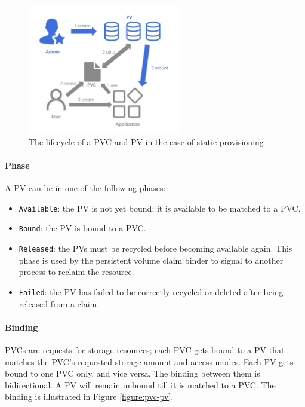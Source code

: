 \begin{figure}[ht]
	\centering
	\includegraphics[width=0.6\textwidth]{resources/pvc-lifecycle.png}
	\caption{The lifecycle of a PVC and PV in the case of static provisioning}
\end{figure}

\paragraph*{Phase} A PV can be in one of the following phases:
\label{section:pv-phase}
\begin{itemize}
	\tightlist
	\item \texttt{Available}: the PV is not yet bound; it is available to be
	      matched to a PVC.
	\item \texttt{Bound}: the PV is bound to a PVC.
	\item \texttt{Released}: the PVs must be recycled before becoming available
	      again. This phase is used by the persistent volume claim binder to
	      signal to another process to reclaim the resource.
	\item \texttt{Failed}: the PV has failed to be correctly recycled or deleted
	      after being released from a claim.
\end{itemize}


\paragraph*{Binding}
PVCs are requests for storage resources; each PVC gets bound to a PV that
matches the PVC's requested storage amount and access modes. Each PV gets bound
to one PVC only, and vice versa. The binding between them is bidirectional.  A
PV will remain unbound till it is matched to a PVC. The binding is illustrated
in Figure \ref{figure:pvc-pv}.

